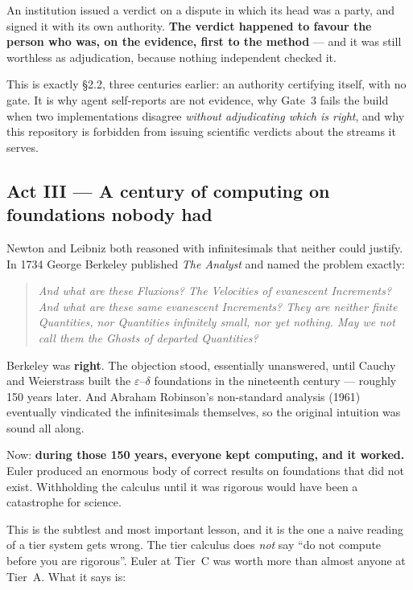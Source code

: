\documentclass[11pt,a4paper]{article}
\begin{document}
An institution issued a verdict on a dispute in which its head was a party, and signed it with
its own authority. \textbf{The verdict happened to favour the person who was, on the evidence,
first to the method} — and it was still worthless as adjudication, because nothing independent
checked it.

This is exactly §2.2, three centuries earlier: an authority certifying itself, with no gate. It
is why agent self-reports are not evidence, why Gate~3 fails the build when two implementations
disagree \emph{without adjudicating which is right}, and why this repository is forbidden from
issuing scientific verdicts about the streams it serves.

\subsection*{Act III — A century of computing on foundations nobody had}

Newton and Leibniz both reasoned with infinitesimals that neither could justify. In 1734 George
Berkeley published \emph{The Analyst} and named the problem exactly:

\begin{quote}\itshape
And what are these Fluxions? The Velocities of evanescent Increments? And what are these same
evanescent Increments? They are neither finite Quantities, nor Quantities infinitely small, nor
yet nothing. May we not call them the Ghosts of departed Quantities?
\end{quote}

Berkeley was \textbf{right}. The objection stood, essentially unanswered, until Cauchy and
Weierstrass built the $\varepsilon$–$\delta$ foundations in the nineteenth century — roughly 150
years later. And Abraham Robinson's non-standard analysis (1961) eventually vindicated the
infinitesimals themselves, so the original intuition was sound all along.

Now: \textbf{during those 150 years, everyone kept computing, and it worked.} Euler produced an
enormous body of correct results on foundations that did not exist. Withholding the calculus
until it was rigorous would have been a catastrophe for science.

This is the subtlest and most important lesson, and it is the one a naive reading of a tier
system gets wrong. The tier calculus does \emph{not} say ``do not compute before you are
rigorous''. Euler at Tier~C was worth more than almost anyone at Tier~A. What it says is:
\end{document}
